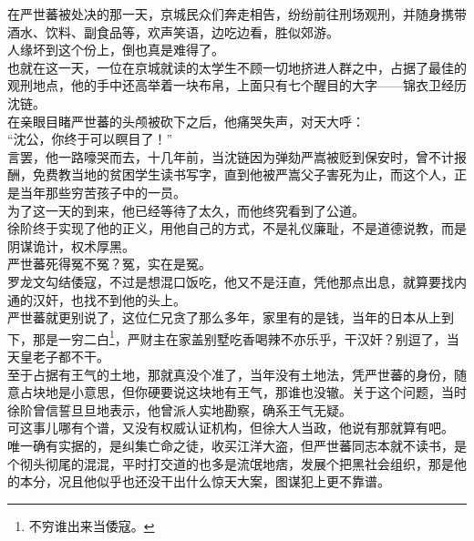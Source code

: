\begin{multicols}{\theparacolNo}
在严世蕃被处决的那一天，京城民众们奔走相告，纷纷前往刑场观刑，并随身携带酒水、饮料、副食品等，欢声笑语，边吃边看，胜似郊游。\\

人缘坏到这个份上，倒也真是难得了。\\

也就在这一天，一位在京城就读的太学生不顾一切地挤进人群之中，占据了最佳的观刑地点，他的手中还高举着一块布帛，上面只有七个醒目的大字——锦衣卫经历沈链。\\

在亲眼目睹严世蕃的头颅被砍下之后，他痛哭失声，对天大呼：\\

“沈公，你终于可以瞑目了！”\\

言罢，他一路嚎哭而去，十几年前，当沈链因为弹劾严嵩被贬到保安时，曾不计报酬，免费教当地的贫困学生读书写字，直到他被严嵩父子害死为止，而这个人，正是当年那些穷苦孩子中的一员。\\

为了这一天的到来，他已经等待了太久，而他终究看到了公道。\\

徐阶终于实现了他的正义，用他自己的方式，不是礼仪廉耻，不是道德说教，而是阴谋诡计，权术厚黑。\\

严世蕃死得冤不冤？冤，实在是冤。\\

罗龙文勾结倭寇，不过是想混口饭吃，他又不是汪直，凭他那点出息，就算要找内通的汉奸，也找不到他的头上。\\

严世蕃就更别说了，这位仁兄贪了那么多年，家里有的是钱，当年的日本从上到下，那是一穷二白\footnote{不穷谁出来当倭寇。}，严财主在家盖别墅吃香喝辣不亦乐乎，干汉奸？别逗了，当天皇老子都不干。\\

至于占据有王气的土地，那就真没个准了，当年没有土地法，凭严世蕃的身份，随意占块地是小意思，但你硬要说这块地有王气，那谁也没辙。关于这个问题，当时徐阶曾信誓旦旦地表示，他曾派人实地勘察，确系王气无疑。\\

可这事儿哪有个谱，又没有权威认证机构，但徐大人当政，他说有那就算有吧。\\

唯一确有实据的，是纠集亡命之徒，收买江洋大盗，但严世蕃同志本就不读书，是个彻头彻尾的混混，平时打交道的也多是流氓地痞，发展个把黑社会组织，那是他的本分，况且他似乎也还没干出什么惊天大案，图谋犯上更不靠谱。\\


\end{multicols}
